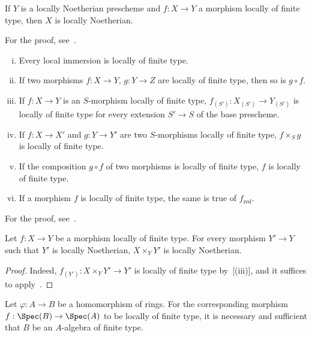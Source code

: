 
\begin{proposition}[1.3.3]
\label{IV.1.3.3}
If $Y$ is a locally Noetherian prescheme and $f:X\to Y$ a
morphism locally of finite type, then $X$ is locally Noetherian.
\end{proposition}

For the proof, see~.

\begin{proposition}[1.3.4]
\label{IV.1.3.4}
\medskip\noindent
\begin{enumerate}[(i)]
  \item Every local immersion is locally of finite type.
  \item If two morphisms $f:X\to Y$, $g:Y\to Z$ are locally of finite type, then so is $g\circ f$.
  \item If $f:X\to Y$ is an $S$-morphism locally of finite type, $f_{(S')}:X_{(S')}\to Y_{(S')}$ is
    locally of finite type for every extension $S'\to S$ of the base prescheme.
  \item If $f:X\to X'$ and $g:Y\to Y'$ are two $S$-morphisms locally of finite type, $f\times_S g$
    is locally of finite type.
  \item If the composition $g\circ f$ of two morphisms is locally of finite type, $f$ is locally of
    finite type.
  \item If a morphism $f$ is locally of finite type, the same is true of $f_{\mathrm{red}}$.
\end{enumerate}
\end{proposition}

For the proof, see~.

\begin{corollary}[1.3.5]
\label{IV.1.3.5}
Let $f:X\to Y$ be a morphism locally of finite type. For every
morphism $Y'\to Y$ such that $Y'$ is locally Noetherian, $X\times_Y Y'$ is locally Noetherian.
\end{corollary}

\begin{proof}
Indeed, $f_{(Y')}:X\times_Y Y'\to Y'$ is locally of finite type by~[(iii)], and it
suffices to apply~.
\end{proof}

\begin{proposition}[1.3.6]
\label{IV.1.3.6}
Let $\varphi:A\to B$ be a homomorphism of rings. For the
corresponding morphism $f:\Spec(B)\to\Spec(A)$ to be locally of finite type, it is necessary and sufficient
that $B$ be an $A$-algebra of finite type.
\end{proposition}

